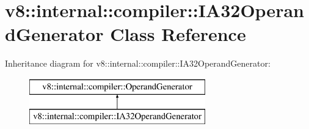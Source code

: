 \hypertarget{classv8_1_1internal_1_1compiler_1_1_i_a32_operand_generator}{}\section{v8\+:\+:internal\+:\+:compiler\+:\+:I\+A32\+Operand\+Generator Class Reference}
\label{classv8_1_1internal_1_1compiler_1_1_i_a32_operand_generator}
Inheritance diagram for v8\+:\+:internal\+:\+:compiler\+:\+:I\+A32\+Operand\+Generator\+:\begin{figure}[H]
\begin{center}
\leavevmode
\includegraphics[height=2.000000cm]{classv8_1_1internal_1_1compiler_1_1_i_a32_operand_generator}
\end{center}
\end{figure}
